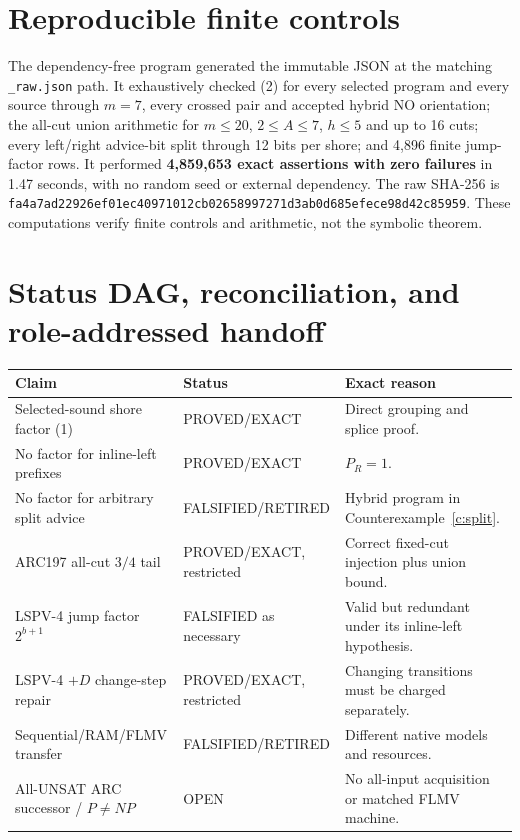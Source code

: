 \documentclass[11pt]{article}
\begin{document}
\section{Reproducible finite controls}
The dependency-free program
generated the immutable JSON at the matching \texttt{\_raw.json} path.
It exhaustively checked (2) for every selected program and every source
through $m=7$, every crossed pair and accepted hybrid NO orientation;
the all-cut union arithmetic for $m\le20$, $2\le A\le7$, $h\le5$ and up to
16 cuts; every left/right advice-bit split through 12 bits per shore; and
4,896 finite jump-factor rows.  It performed
\textbf{4,859,653 exact assertions with zero failures} in 1.47 seconds,
with no random seed or external dependency.  The raw SHA-256 is
\texttt{fa4a7ad22926ef01ec40971012cb02658997271d3ab0d685efece98d42c85959}.
These computations verify finite controls and arithmetic, not the symbolic
theorem.

\section{Status DAG, reconciliation, and role-addressed handoff}
\begin{center}\small
\begin{tabularx}{.97\linewidth}{p{.32\linewidth}p{.20\linewidth}X}
\toprule
Claim & Status & Exact reason\\\midrule
Selected-sound shore factor (1) & PROVED/EXACT & Direct grouping and splice proof.\\
No factor for inline-left prefixes & PROVED/EXACT & $P_R=1$.\\
No factor for arbitrary split advice & FALSIFIED/RETIRED & Hybrid program in Counterexample~\ref{c:split}.\\
ARC197 all-cut $3/4$ tail & PROVED/EXACT, restricted & Correct fixed-cut injection plus union bound.\\
LSPV-4 jump factor $2^{b+1}$ & FALSIFIED as necessary & Valid but redundant under its inline-left hypothesis.\\
LSPV-4 $+D$ change-step repair & PROVED/EXACT, restricted & Changing transitions must be charged separately.\\
Sequential/RAM/FLMV transfer & FALSIFIED/RETIRED & Different native models and resources.\\
All-UNSAT ARC successor / $P\ne NP$ & OPEN & No all-input acquisition or matched FLMV machine.\\
\bottomrule
\end{tabularx}
\end{center}
\end{document}
